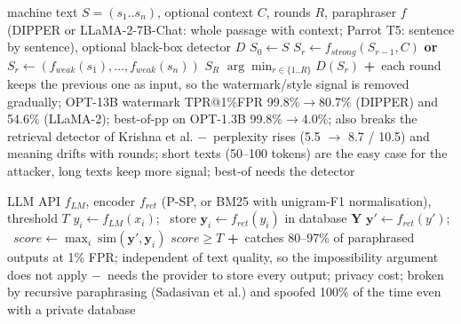 \documentclass[10pt,a4paper,twocolumn]{article}
\newcommand{\pro}[1]{\Statex\textcolor{proc}{\textbf{+}\ #1}}
\newcommand{\con}[1]{\Statex\textcolor{conc}{\textbf{$-$}\ #1}}
\begin{document}
\begin{algorithm}[H]\small
\caption{Recursive paraphrasing (Sadasivan et al.\ 2023)}
\begin{algorithmic}[1]
\Require machine text $S=(s_1..s_n)$, optional context $C$, rounds $R$, paraphraser $f$ (DIPPER or LLaMA-2-7B-Chat: whole passage with context; Parrot T5: sentence by sentence), optional black-box detector $D$
 \State $S_0\gets S$
  \State $S_r\gets f_{strong}(S_{r-1},C)$ \textbf{or} $S_r\gets(f_{weak}(s_1),\dots,f_{weak}(s_n))$ 
 \EndFor
 \State \Return $S_R$
\EndProcedure
{} 
 \State \Return $\arg\min_{r\in\{1..R\}}D(S_r)$ 
\EndProcedure
\pro{each round keeps the previous one as input, so the watermark/style signal is removed gradually; OPT-13B watermark TPR@1\%FPR 99.8\%$\to$80.7\% (DIPPER) and 54.6\% (LLaMA-2); best-of-pp on OPT-1.3B 99.8\%$\to$4.0\%; also breaks the retrieval detector of Krishna et al.}
\con{perplexity rises (5.5 $\to$ 8.7 / 10.5) and meaning drifts with rounds; short texts (50--100 tokens) are the easy case for the attacker, long texts keep more signal; best-of needs the detector}
\end{algorithmic}
\end{algorithm}

\begin{algorithm}[H]\small
\caption{Retrieval defense against paraphrasing (Krishna et al.\ 2023)}
\begin{algorithmic}[1]
\Require LLM API $f_{LM}$, encoder $f_{ret}$ (P-SP, or BM25 with unigram-F1 normalisation), threshold $T$
 
 \State $y_i\gets f_{LM}(x_i)$; \ store $\mathbf y_i\gets f_{ret}(y_i)$ in database $\mathbf Y$ 
\EndProcedure
{}
 \State $\mathbf y'\gets f_{ret}(y')$; \ $\mathit{score}\gets\max_i\ \mathrm{sim}(\mathbf y',\mathbf y_i)$ 
 \State \Return $\mathit{score}\ge T$
\EndProcedure
\pro{catches 80--97\% of paraphrased outputs at 1\% FPR; independent of text quality, so the impossibility argument does not apply}
\con{needs the provider to store every output; privacy cost; broken by recursive paraphrasing (Sadasivan et al.) and spoofed 100\% of the time even with a private database}
\end{algorithmic}
\end{algorithm}
\end{document}

